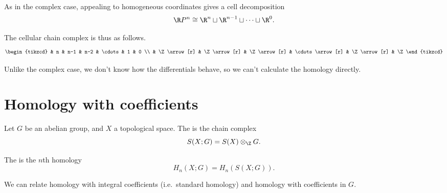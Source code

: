 \documentclass[main.tex]{subfiles}
\begin{document}
\begin{example}
  As in the complex case, appealing to homogeneous coordinates gives a cell decomposition
  \begin{equation*}
    \R P^{n} \cong \R^{n} \sqcup \R^{n-1} \sqcup \cdots \sqcup \R^{0}.
  \end{equation*}

  The cellular chain complex is thus as follows.
  \begin{equation*}
    \begin{tikzcd}
      & n
      & n-1
      & n-2
      & \cdots
      & 1
      & 0
      \\
      & \Z
      \arrow[r]
      & \Z
      \arrow[r]
      & \Z
      \arrow[r]
      & \cdots
      \arrow[r]
      & \Z
      \arrow[r]
      & \Z
    \end{tikzcd}
  \end{equation*}

  Unlike the complex case, we don't know how the differentials behave, so we can't calculate the homology directly.
\end{example}

\section{Homology with coefficients}
\label{sec:homology_with_coefficients}

\begin{definition}
  \label{def:homology_with_coefficients}
  Let $G$ be an abelian group, and $X$ a topological space. The  is the chain complex
  \begin{equation*}
    S(X; G) = S(X) \otimes_{\Z} G.
  \end{equation*}

  The  is the $n$th homology
  \begin{equation*}
    H_{n}(X; G) = H_{n}(S(X; G)).
  \end{equation*}
\end{definition}

We can relate homology with integral coefficients (i.e.\ standard homology) and homology with coefficients in $G$.
\end{document}
